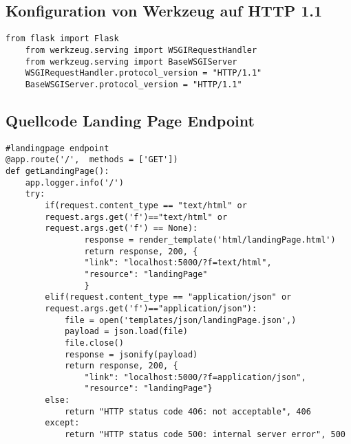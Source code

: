 \subsection{Konfiguration von Werkzeug auf HTTP 1.1}
\begin{lstlisting}[caption={Konfiguration von Werkzeug auf HTTP 1.1}, style = Python]
    from flask import Flask
    from werkzeug.serving import WSGIRequestHandler
    from werkzeug.serving import BaseWSGIServer
    WSGIRequestHandler.protocol_version = "HTTP/1.1"
    BaseWSGIServer.protocol_version = "HTTP/1.1"
\end{lstlisting}\label{QuellcodeconfWerkzeug}

\subsection{Quellcode Landing Page Endpoint}
\begin{lstlisting}[caption={Landing Page Endpoint}, style = Python]
#landingpage endpoint
@app.route('/',  methods = ['GET'])
def getLandingPage():
    app.logger.info('/') 
    try:
        if(request.content_type == "text/html" or
        request.args.get('f')=="text/html" or 
        request.args.get('f') == None):
                response = render_template('html/landingPage.html') 
                return response, 200, {
                "link": "localhost:5000/?f=text/html", 
                "resource": "landingPage"
                } 
        elif(request.content_type == "application/json" or
        request.args.get('f')=="application/json"): 
            file = open('templates/json/landingPage.json',) 
            payload = json.load(file) 
            file.close() 
            response = jsonify(payload) 
            return response, 200, {
                "link": "localhost:5000/?f=application/json", 
                "resource": "landingPage"} 
        else:
            return "HTTP status code 406: not acceptable", 406 
        except:
            return "HTTP status code 500: internal server error", 500 
\end{lstlisting}\label{QuellcodeLandingPage}

\newpage
